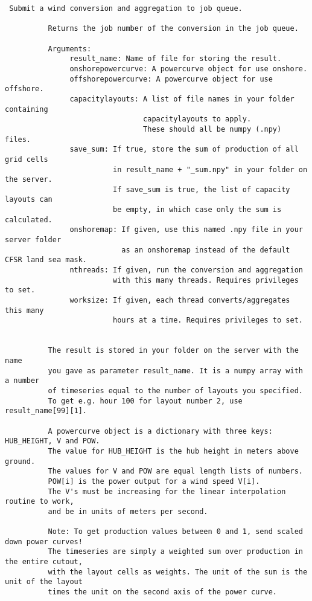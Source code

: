 \begin{verbatim}
 Submit a wind conversion and aggregation to job queue.

          Returns the job number of the conversion in the job queue.

          Arguments:
               result_name: Name of file for storing the result.
               onshorepowercurve: A powercurve object for use onshore.
               offshorepowercurve: A powercurve object for use offshore.
               capacitylayouts: A list of file names in your folder containing
                                capacitylayouts to apply.
                                These should all be numpy (.npy) files.
               save_sum: If true, store the sum of production of all grid cells
                         in result_name + "_sum.npy" in your folder on the server.
                         If save_sum is true, the list of capacity layouts can
                         be empty, in which case only the sum is calculated.
               onshoremap: If given, use this named .npy file in your server folder
                           as an onshoremap instead of the default CFSR land sea mask.
               nthreads: If given, run the conversion and aggregation
                         with this many threads. Requires privileges to set.
               worksize: If given, each thread converts/aggregates this many
                         hours at a time. Requires privileges to set.

     
          The result is stored in your folder on the server with the name
          you gave as parameter result_name. It is a numpy array with a number
          of timeseries equal to the number of layouts you specified.
          To get e.g. hour 100 for layout number 2, use result_name[99][1]. 

          A powercurve object is a dictionary with three keys: HUB_HEIGHT, V and POW.
          The value for HUB_HEIGHT is the hub height in meters above ground.
          The values for V and POW are equal length lists of numbers.
          POW[i] is the power output for a wind speed V[i].
          The V's must be increasing for the linear interpolation routine to work,
          and be in units of meters per second.

          Note: To get production values between 0 and 1, send scaled down power curves!
          The timeseries are simply a weighted sum over production in the entire cutout,
          with the layout cells as weights. The unit of the sum is the unit of the layout
          times the unit on the second axis of the power curve.
          
\end{verbatim}
